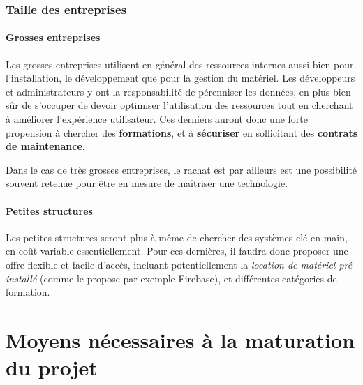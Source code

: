\documentclass[a4paper,10pt]{scrreprt}
\begin{document}
        \subsection{Taille des entreprises}
        
            \subsubsection{Grosses entreprises}
            
                Les grosses entreprises utilisent en général des ressources internes aussi bien pour l'installation, le développement que pour la gestion du matériel. Les dévelop\-peurs et administrateurs y ont la responsabilité de pérenniser les données, en plus bien sûr de s'occuper de devoir optimiser l'utilisation des ressources tout en cherchant à améliorer l'expérience utilisateur. Ces derniers auront donc une forte propension à chercher des \textbf{formations}, et à \textbf{sécuriser} en sollicitant des \textbf{contrats de maintenance}.
                
                Dans le cas de très grosses entreprises, le rachat est par ailleurs est une possibilité souvent retenue pour être en mesure de maîtriser une technologie.
                    
            \subsubsection{Petites structures}
            
                Les petites structures seront plus à même de chercher des systèmes clé en main, en coût variable essentiellement. Pour ces dernières, il faudra donc proposer une offre flexible et facile d'accès, incluant potentiellement la \textit{location de matériel pré-installé} (comme le propose par exemple Firebase), et différentes catégories de formation.
    
    
    
\chapter{Moyens nécessaires à la maturation du projet}
\end{document}
